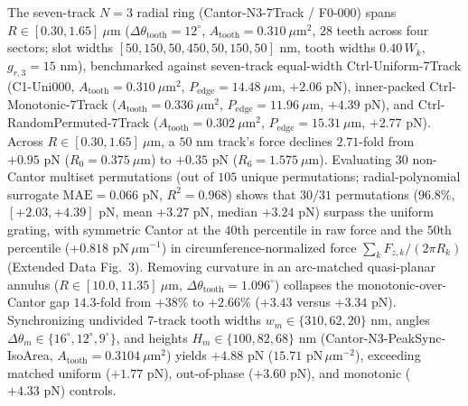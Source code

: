 \documentclass[11pt, a4paper]{article}
\begin{document}
The seven-track $N=3$ radial ring (Cantor-N3-7Track / F0-000) spans $R \in [0.30, 1.65]\ \mu\text{m}$ ($\Delta\theta_{\mathrm{tooth}} = 12^\circ$, $A_{\mathrm{tooth}} = 0.310\ \mu\text{m}^2$, $28$ teeth across four sectors; slot widths $[50, 150, 50, 450, 50, 150, 50]\text{ nm}$, tooth widths $0.40\,W_k$, $g_{r,3} = 15\text{ nm}$), benchmarked against seven-track equal-width Ctrl-Uniform-7Track (C1-Uni000, $A_{\mathrm{tooth}} = 0.310\ \mu\text{m}^2$, $P_{\mathrm{edge}} = 14.48\ \mu\text{m}$, $+2.06\text{ pN}$), inner-packed Ctrl-Monotonic-7Track ($A_{\mathrm{tooth}} = 0.336\ \mu\text{m}^2$, $P_{\mathrm{edge}} = 11.96\ \mu\text{m}$, $+4.39\text{ pN}$), and Ctrl-RandomPermuted-7Track ($A_{\mathrm{tooth}} = 0.302\ \mu\text{m}^2$, $P_{\mathrm{edge}} = 15.31\ \mu\text{m}$, $+2.77\text{ pN}$). Across $R \in [0.30, 1.65]\ \mu\text{m}$, a $50\text{ nm}$ track's force declines $2.71$-fold from $+0.95\text{ pN}$ ($R_0 = 0.375\ \mu\text{m}$) to $+0.35\text{ pN}$ ($R_6 = 1.575\ \mu\text{m}$). Evaluating $30$ non-Cantor multiset permutations (out of $105$ unique permutations; radial-polynomial surrogate $\mathrm{MAE} = 0.066\text{ pN}$, $R^2 = 0.968$) shows that $30/31$ permutations ($96.8\%$, $[+2.03, +4.39]\text{ pN}$, mean $+3.27\text{ pN}$, median $+3.24\text{ pN}$) surpass the uniform grating, with symmetric Cantor at the $40$th percentile in raw force and the $50$th percentile ($+0.818\text{ pN}\,\mu\text{m}^{-1}$) in circumference-normalized force $\sum_k F_{z,k}/(2\pi R_k)$ (Extended Data Fig.~3). Removing curvature in an arc-matched quasi-planar annulus ($R \in [10.0, 11.35]\ \mu\text{m}$, $\Delta\theta_{\mathrm{tooth}} = 1.096^\circ$) collapses the monotonic-over-Cantor gap $14.3$-fold from $+38\%$ to $+2.66\%$ ($+3.43$ versus $+3.34\text{ pN}$). Synchronizing undivided 7-track tooth widths $w_m \in \{310, 62, 20\}\text{ nm}$, angles $\Delta\theta_m \in \{16^\circ, 12^\circ, 9^\circ\}$, and heights $H_m \in \{100, 82, 68\}\text{ nm}$ (Cantor-N3-PeakSync-IsoArea, $A_{\mathrm{tooth}} = 0.3104\ \mu\text{m}^2$) yields $+4.88\text{ pN}$ ($15.71\text{ pN}\,\mu\text{m}^{-2}$), exceeding matched uniform ($+1.77\text{ pN}$), out-of-phase ($+3.60\text{ pN}$), and monotonic ($+4.33\text{ pN}$) controls.
\end{document}
